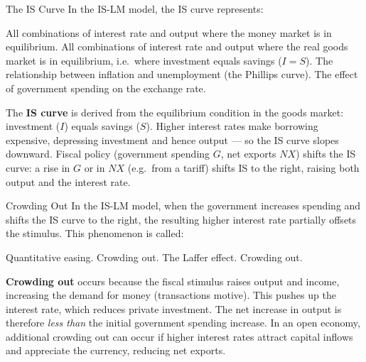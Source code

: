 \documentclass[paper=a5]{scrartcl}
\begin{document}
\begin{question}[type=mc]{The IS Curve}
In the IS-LM model, the IS curve represents:
\begin{choices}
  \choice        All combinations of interest rate and output where the money
                 market is in equilibrium.
  \correctchoice All combinations of interest rate and output where the real
                 goods market is in equilibrium, i.e.\ where investment equals
                 savings ($I = S$).
  \choice        The relationship between inflation and unemployment (the
                 Phillips curve).
  \choice        The effect of government spending on the exchange rate.
\end{choices}
\begin{solution}
  The \textbf{IS curve} is derived from the equilibrium condition in the
  goods market: investment ($I$) equals savings ($S$). Higher interest rates
  make borrowing expensive, depressing investment and hence output --- so the
  IS curve slopes downward. Fiscal policy (government spending $G$, net
  exports $NX$) shifts the IS curve: a rise in $G$ or in $NX$ (e.g.\ from
  a tariff) shifts IS to the right, raising both output and the interest rate.
\end{solution}
\end{question}

\begin{question}[type=mc]{Crowding Out}
In the IS-LM model, when the government increases spending and shifts the IS
curve to the right, the resulting higher interest rate partially offsets the
stimulus. This phenomenon is called:
\begin{choices}
  \choice        Quantitative easing.
  \correctchoice Crowding out.
  \choice        The Laffer effect.
  \correctchoice Crowding out.
\end{choices}
\begin{solution}
  \textbf{Crowding out} occurs because the fiscal stimulus raises output and
  income, increasing the demand for money (transactions motive). This pushes
  up the interest rate, which reduces private investment. The net increase in
  output is therefore \emph{less than} the initial government spending
  increase. In an open economy, additional crowding out can occur if higher
  interest rates attract capital inflows and appreciate the currency, reducing
  net exports.
\end{solution}
\end{question}
\end{document}

